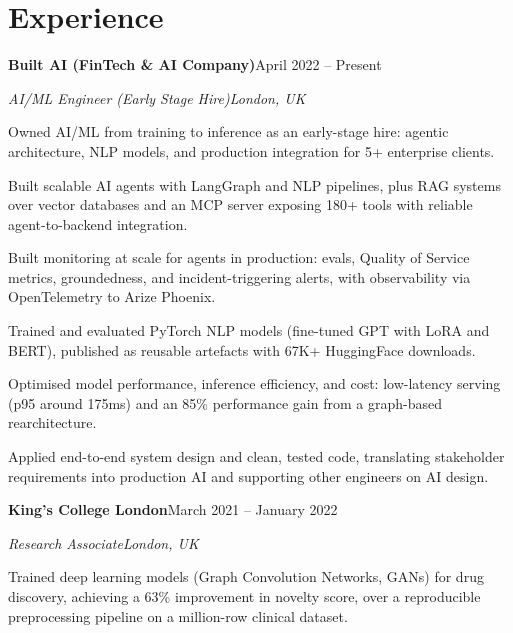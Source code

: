 \documentclass[10pt,a4paper]{article}
\newcommand{\entry}[4]{%
  {\color{company}\bfseries #1}\hfill {\color{muted}#2}\par
  \vspace{1pt}
  {\itshape #3}\hfill {\color{muted}\itshape #4}\par
  \vspace{3pt}%
}
\begin{document}
\section{Experience}
\entry{Built AI (FinTech \& AI Company)}{April 2022 -- Present}{AI/ML Engineer (Early Stage Hire)}{London, UK}
\begin{tight}
  \item Owned AI/ML from training to inference as an early-stage hire: agentic architecture, NLP models, and production integration for 5+ enterprise clients.
  \item Built scalable AI agents with LangGraph and NLP pipelines, plus RAG systems over vector databases and an MCP server exposing 180+ tools with reliable agent-to-backend integration.
  \item Built monitoring at scale for agents in production: evals, Quality of Service metrics, groundedness, and incident-triggering alerts, with observability via OpenTelemetry to Arize Phoenix.
  \item Trained and evaluated PyTorch NLP models (fine-tuned GPT with LoRA and BERT), published as reusable artefacts with 67K+ HuggingFace downloads.
  \item Optimised model performance, inference efficiency, and cost: low-latency serving (p95 around 175ms) and an 85\% performance gain from a graph-based rearchitecture.
  \item Applied end-to-end system design and clean, tested code, translating stakeholder requirements into production AI and supporting other engineers on AI design.
\end{tight}

\entry{King's College London}{March 2021 -- January 2022}{Research Associate}{London, UK}
\begin{tight}
  \item Trained deep learning models (Graph Convolution Networks, GANs) for drug discovery, achieving a 63\% improvement in novelty score, over a reproducible preprocessing pipeline on a million-row clinical dataset.
\end{tight}

\end{document}

